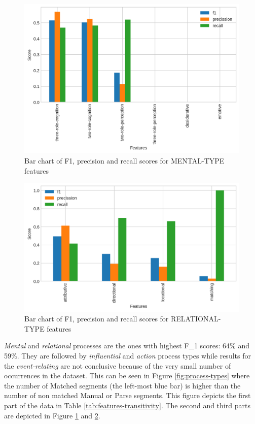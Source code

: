     \begin{figure}[!ht]
        \centering
        \includegraphics[width=.65\textwidth]{evaluation-results/figures/accuracy-semantic-mental-type-f1}
        \caption{Bar chart of F1, precision and recall scores for MENTAL-TYPE features}
        \label{fig:mental-types}
    \end{figure}
    
    \begin{figure}[!ht]
        \centering
        \includegraphics[width=.65\textwidth]{evaluation-results/figures/accuracy-semantic-relational-type-f1}
        \caption{Bar chart of F1, precision and recall scores for RELATIONAL-TYPE features}
        \label{fig:relational-types}
    \end{figure}

    \textit{Mental} and \textit{relational} processes are the ones with highest F_1 scores: 64\% and 59\%. They are followed by \textit{influential} and \textit{action} process types while results for the \textit{event-relating} are not conclusive because of the very small number of occurrences in the dataset. This can be seen in Figure \ref{fig:process-types} where the number of Matched segments (the left-most blue bar) is higher than the number of non matched Manual or Parse segments. This figure depicts the first part of the data in Table \ref{tab:features-transitivity}. The second and third parts are depicted in Figure \ref{fig:mental-types} and \ref{fig:relational-types}.

